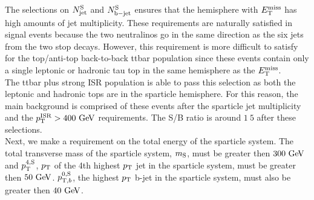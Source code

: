 \indent The selections on $N_{\mathrm{jet}}^{\mathrm{S}}$ and $N_{\mathrm{b-jet}}^{\mathrm{S}}$ ensures that the hemisphere with $E_{\mathrm{T}}^{\mathrm{miss}}$ has high amounts of jet multiplicity.  These requirements are naturally satisfied in signal events because the two neutralinos go in the same direction as the six jets from the two stop decays.  However, this requirement is more difficult to satisfy for the top/anti-top back-to-back ttbar population since these events contain only a single leptonic or hadronic tau top in the same hemisphere as the $E_{\mathrm{T}}^{\mathrm{miss}}$.  \\

\indent The ttbar plus strong ISR population is able to pass this selection as both the leptonic and hadronic tops are in the sparticle hemisphere.  For this reason, the main background is comprised of these events after the sparticle jet multiplicity and the $\pTISR > 400 \GeV$ requirements.  The S/B ratio is around $1\:5$ after these selections.  \\



\indent Next, we make a requirement on the total energy of the sparticle system.  The total transverse mass of the sparticle system, $m_{\mathrm{S}}$, must be greater then $300 \gev$ and $p_{\mathrm{T}}^{4,\mathrm{S}}$, $p_{\mathrm{T}}$ of the 4th highest $p_{\mathrm{T}}$ jet in the sparticle system, must be greater then $50 \gev$.  $p_{\mathrm{T},b}^{0,\mathrm{S}}$, the highest $p_{\mathrm{T}}$ b-jet in the sparticle system, must also be greater then $40 \gev$.   \\

